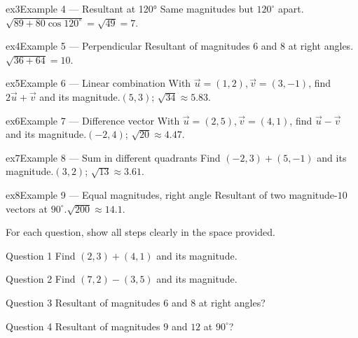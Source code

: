 \documentclass[11pt]{article}
\begin{document}
\begin{example}{ex3}{Example 4 --- Resultant at 120°}
Same magnitudes but $120^\circ$ apart.\soln $\sqrt{89+80\cos120^\circ}=\sqrt{49}=7$.
\end{example}

\begin{example}{ex4}{Example 5 --- Perpendicular}
Resultant of magnitudes $6$ and $8$ at right angles.\soln $\sqrt{36+64}=10$.
\end{example}

\begin{example}{ex5}{Example 6 --- Linear combination}
With $\vec u=(1,2),\vec v=(3,-1)$, find $2\vec u+\vec v$ and its magnitude.\soln $(5,3)$; $\sqrt{34}\approx5.83$.
\end{example}

\begin{example}{ex6}{Example 7 --- Difference vector}
With $\vec u=(2,5),\vec v=(4,1)$, find $\vec u-\vec v$ and its magnitude.\soln $(-2,4)$; $\sqrt{20}\approx4.47$.
\end{example}

\begin{example}{ex7}{Example 8 --- Sum in different quadrants}
Find $(-2,3)+(5,-1)$ and its magnitude.\soln $(3,2)$; $\sqrt{13}\approx3.61$.
\end{example}

\begin{example}{ex8}{Example 9 --- Equal magnitudes, right angle}
Resultant of two magnitude-$10$ vectors at $90^\circ$.\soln $\sqrt{200}\approx14.1$.
\end{example}

\clearpage
{}
For each question, show all steps clearly in the space provided.

\begin{qbox}{Question 1}
Find $(2,3)+(4,1)$ and its magnitude.\workspace{2.4cm}
\end{qbox}

\begin{qbox}{Question 2}
Find $(7,2)-(3,5)$ and its magnitude.\workspace{2.4cm}
\end{qbox}

\begin{qbox}{Question 3}
Resultant of magnitudes $6$ and $8$ at right angles?\workspace{2.4cm}
\end{qbox}

\begin{qbox}{Question 4}
Resultant of magnitudes $9$ and $12$ at $90^\circ$?\workspace{2.4cm}
\end{qbox}
\end{document}
